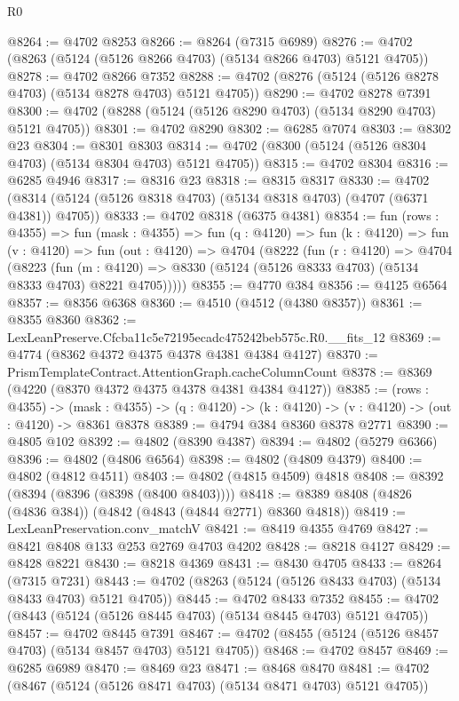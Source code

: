\begin{lexlean}{R0}
\begin{coremodule}
@8264 := @4702 @8253
@8266 := @8264 (@7315 @6989)
@8276 := @4702 (@8263 (@5124 (@5126 @8266 @4703) (@5134 @8266 @4703) @5121 @4705))
@8278 := @4702 @8266 @7352
@8288 := @4702 (@8276 (@5124 (@5126 @8278 @4703) (@5134 @8278 @4703) @5121 @4705))
@8290 := @4702 @8278 @7391
@8300 := @4702 (@8288 (@5124 (@5126 @8290 @4703) (@5134 @8290 @4703) @5121 @4705))
@8301 := @4702 @8290
@8302 := @6285 @7074
@8303 := @8302 @23
@8304 := @8301 @8303
@8314 := @4702 (@8300 (@5124 (@5126 @8304 @4703) (@5134 @8304 @4703) @5121 @4705))
@8315 := @4702 @8304
@8316 := @6285 @4946
@8317 := @8316 @23
@8318 := @8315 @8317
@8330 := @4702 (@8314 (@5124 (@5126 @8318 @4703) (@5134 @8318 @4703) (@4707 (@6371 @4381)) @4705))
@8333 := @4702 @8318 (@6375 @4381)
@8354 := fun (rows : @4355) =>
  fun (mask : @4355) =>
  fun (q : @4120) =>
  fun (k : @4120) =>
  fun (v : @4120) =>
  fun (out : @4120) =>
  @4704
    (@8222
      (fun (r : @4120) =>
      @4704
        (@8223
          (fun (m : @4120) => @8330 (@5124 (@5126 @8333 @4703) (@5134 @8333 @4703) @8221 @4705)))))
@8355 := @4770 @384
@8356 := @4125 @6564
@8357 := @8356 @6368
@8360 := @4510 (@4512 (@4380 @8357))
@8361 := @8355 @8360
@8362 := LexLeanPreserve.Cfcba11c5e72195ecadc475242beb575c.R0.__fits_12
@8369 := @4774 (@8362 @4372 @4375 @4378 @4381 @4384 @4127)
@8370 := PrismTemplateContract.AttentionGraph.cacheColumnCount
@8378 := @8369 (@4220 (@8370 @4372 @4375 @4378 @4381 @4384 @4127))
@8385 := (rows : @4355) ->
  (mask : @4355) -> (q : @4120) -> (k : @4120) -> (v : @4120) -> (out : @4120) -> @8361 @8378
@8389 := @4794 @384 @8360 @8378 @2771
@8390 := @4805 @102
@8392 := @4802 (@8390 @4387)
@8394 := @4802 (@5279 @6366)
@8396 := @4802 (@4806 @6564)
@8398 := @4802 (@4809 @4379)
@8400 := @4802 (@4812 @4511)
@8403 := @4802 (@4815 @4509) @4818
@8408 := @8392 (@8394 (@8396 (@8398 (@8400 @8403))))
@8418 := @8389 @8408 (@4826 (@4836 @384)) (@4842 (@4843 (@4844 @2771) @8360 @4818))
@8419 := LexLeanPreservation.conv_matchV
@8421 := @8419 @4355 @4769
@8427 := @8421 @8408 @133 @253 @2769 @4703 @4202
@8428 := @8218 @4127
@8429 := @8428 @8221
@8430 := @8218 @4369
@8431 := @8430 @4705
@8433 := @8264 (@7315 @7231)
@8443 := @4702 (@8263 (@5124 (@5126 @8433 @4703) (@5134 @8433 @4703) @5121 @4705))
@8445 := @4702 @8433 @7352
@8455 := @4702 (@8443 (@5124 (@5126 @8445 @4703) (@5134 @8445 @4703) @5121 @4705))
@8457 := @4702 @8445 @7391
@8467 := @4702 (@8455 (@5124 (@5126 @8457 @4703) (@5134 @8457 @4703) @5121 @4705))
@8468 := @4702 @8457
@8469 := @6285 @6989
@8470 := @8469 @23
@8471 := @8468 @8470
@8481 := @4702 (@8467 (@5124 (@5126 @8471 @4703) (@5134 @8471 @4703) @5121 @4705))

\end{coremodule}
\end{lexlean}
